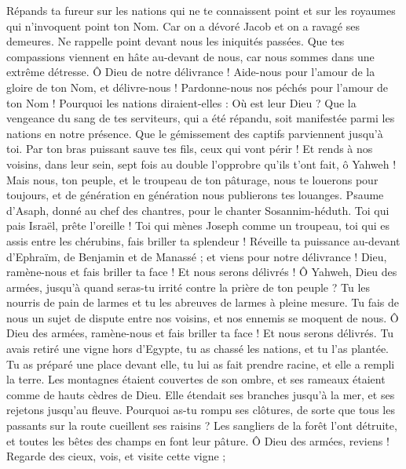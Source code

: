 \begin{multicols}{2}
Répands ta fureur sur les nations qui ne te connaissent point et sur les royaumes qui n'invoquent point ton Nom.
Car on a dévoré Jacob et on a ravagé ses demeures.
Ne rappelle point devant nous les iniquités passées. Que tes compassions viennent en hâte au-devant de nous, car nous sommes dans une extrême détresse.
Ô Dieu de notre délivrance ! Aide-nous pour l'amour de la gloire de ton Nom, et délivre-nous ! Pardonne-nous nos péchés pour l'amour de ton Nom !
Pourquoi les nations diraient-elles : Où est leur Dieu ? Que la vengeance du sang de tes serviteurs, qui a été répandu, soit manifestée parmi les nations en notre présence.
Que le gémissement des captifs parviennent jusqu'à toi. Par ton bras puissant sauve tes fils, ceux qui vont périr !
Et rends à nos voisins, dans leur sein, sept fois au double l'opprobre qu'ils t'ont fait, ô Yahweh !
Mais nous, ton peuple, et le troupeau de ton pâturage, nous te louerons pour toujours, et de génération en génération nous publierons tes louanges.
\VerseOne{}Psaume d'Asaph, donné au chef des chantres, pour le chanter Sosannim-héduth.
Toi qui pais Israël, prête l'oreille ! Toi qui mènes Joseph comme un troupeau, toi qui es assis entre les chérubins, fais briller ta splendeur !
Réveille ta puissance au-devant d'Ephraïm, de Benjamin et de Manassé ; et viens pour notre délivrance !
Dieu, ramène-nous et fais briller ta face ! Et nous serons délivrés !
Ô Yahweh, Dieu des armées, jusqu'à quand seras-tu irrité contre la prière de ton peuple ?
Tu les nourris de pain de larmes et tu les abreuves de larmes à pleine mesure.
Tu fais de nous un sujet de dispute entre nos voisins, et nos ennemis se moquent de nous.
Ô Dieu des armées, ramène-nous et fais briller ta face ! Et nous serons délivrés.
Tu avais retiré une vigne hors d'Egypte, tu as chassé les nations, et tu l'as plantée.
Tu as préparé une place devant elle, tu lui as fait prendre racine, et elle a rempli la terre.
Les montagnes étaient couvertes de son ombre, et ses rameaux étaient comme de hauts cèdres de Dieu.
Elle étendait ses branches jusqu'à la mer, et ses rejetons jusqu'au fleuve.
Pourquoi as-tu rompu ses clôtures, de sorte que tous les passants sur la route cueillent ses raisins ?
Les sangliers de la forêt l'ont détruite, et toutes les bêtes des champs en font leur pâture.
Ô Dieu des armées, reviens ! Regarde des cieux, vois, et visite cette vigne ;

\end{multicols}

